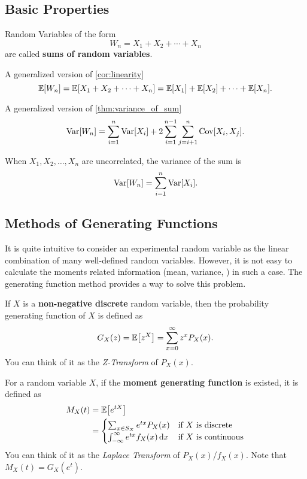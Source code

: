 \subsection{Basic Properties}
\begin{definition}
    Random Variables of the form
    \[W_n=X_1+X_2+\cdots+X_n\]
    are called \textbf{sums of random variables}.
\end{definition}

\begin{theorem}
    A generalized version of \cref{cor:linearity}
    \[\E{W_n}=\E{X_1+X_2+\cdots+X_n}=\E{X_1}+\E{X_2}+\cdots+\E{X_n}.\]
\end{theorem}

\begin{theorem}
    A generalized version of \cref{thm:variance_of_sum}
    \[\mathop{\mathrm{Var}}\nolimits[W_n]=\sum_{i=1}^{n}\mathop{\mathrm{Var}}\nolimits[X_i]+2\sum_{i=1}^{n-1}\sum_{j=i+1}^{n}\mathop{\mathrm{Cov}}\nolimits[X_i,X_j].\]
\end{theorem}

\begin{corollary}
    When $X_1,X_2,\ldots,X_n$ are uncorrelated, the variance of the sum is
    \[\mathop{\mathrm{Var}}\nolimits[W_n]=\sum_{i=1}^{n}\mathop{\mathrm{Var}}\nolimits[X_i].\]
\end{corollary}

\subsection{Methods of Generating Functions}
It is quite intuitive to consider an experimental random variable as the linear combination of many well-defined random variables. However, it is not easy to calculate the moments related information (\eg mean, variance, \etc) in such a case. The generating function method provides a way to solve this problem.
\begin{definition}
    If $X$ is a \textbf{non-negative discrete} random variable, then the probability generating function of $X$ is defined as
    \[G_X(z)=\E{z^X}=\sum_{x=0}^{\infty}z^xP_X(x).\]
    You can think of it as the \textit{Z-Transform} of $P_X(x)$.
\end{definition}

\begin{definition}
    For a random variable $X$, if the \textbf{moment generating function} is existed, it is defined as
    \begin{align*}
        M_X(t)&=\E{e^{tX}}\\
        &=\begin{cases}
            \sum_{x\in S_X}e^{tx}P_X(x) & \text{if $X$ is discrete}\\
            \int_{-\infty}^{\infty}e^{tx}f_X(x)\diff x & \text{if $X$ is continuous}
        \end{cases}
    \end{align*}
    You can think of it as the \textit{Laplace Transform} of $P_X(x)$/$f_X(x)$. Note that $M_X(t)=G_X(e^t)$.
\end{definition}

